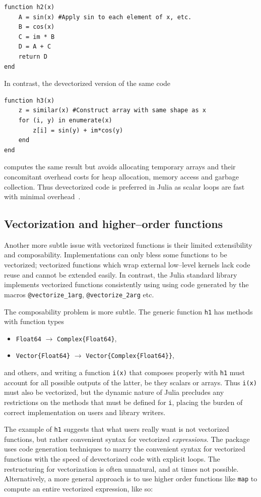 \documentclass[pldi]{sigplanconf-pldi15}
\begin{document}
\begin{lstlisting}
function h2(x)
    A = sin(x) #Apply sin to each element of x, etc.
    B = cos(x)
    C = im * B
    D = A + C
    return D
end
\end{lstlisting}
%
In contrast, the devectorized version of the same code

\begin{lstlisting}
function h3(x)
    z = similar(x) #Construct array with same shape as x
    for (i, y) in enumerate(x)
        z[i] = sin(y) + im*cos(y)
    end
end
\end{lstlisting}
%
computes the same result but avoids allocating temporary arrays and their
concomitant overhead costs for heap allocation, memory access and garbage
collection. Thus devectorized code is preferred in Julia as scalar loops are
fast with minimal overhead~\cite{Bezanson2014b}. 


\subsection{Vectorization and higher--order functions}

Another more subtle issue with vectorized functions is their limited
extensibility and composability. Implementations can only bless some
functions to be vectorized; vectorized functions which wrap external low--level
kernels lack code reuse and cannot be extended easily. In contrast, the Julia
standard library implements vectorized functions consistently using using code
generated by the macros \verb|@vectorize_1arg|, \verb|@vectorize_2arg| etc.

The composability problem is more subtle. The generic function \verb|h1| has
methods with function types

\begin{itemize}
	\item \verb|Float64| $\rightarrow$ \verb|Complex{Float64}|,
	\item \verb|Vector{Float64}| $\rightarrow$ \verb|Vector{Complex{Float64}}|,
\end{itemize}
%
and others, and writing a function \verb|i(x)| that composes properly with
\verb|h1| must account for all possible outputs of the latter, be they scalars
or arrays. Thus \verb|i(x)| must also be vectorized, but the dynamic nature of
Julia precludes any restrictions on the methods that must be defined for
\verb|i|, placing the burden of correct implementation on users and library
writers.

The example of \verb|h1| suggests that what users really want is not vectorized
functions, but rather convenient syntax for vectorized \textit{expressions}.
The  package uses code generation techniques to marry
the convenient syntax for vectorized functions with the speed of devectorized
code with explicit loops. The restructuring for vectorization is often
unnatural, and at times not possible. Alternatively, a more general approach is
to use higher order functions like \verb|map| to compute an entire vectorized
expression, like so:
\end{document}
